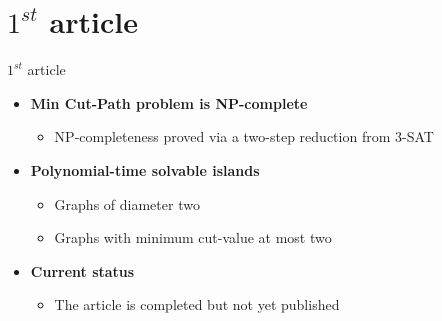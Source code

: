 \documentclass [xcolor=svgnames, t] {beamer}
\begin{document}
\section{$1^{st}$ article}


\begin{frame}{$1^{st}$ article}
\begin{itemize}
    \item \textbf{Min Cut-Path problem is NP-complete}
    \begin{itemize}
        \item NP-completeness proved via a two-step reduction from \textsc{3-SAT}
    \end{itemize}
    
    \item \textbf{Polynomial-time solvable islands}
    \begin{itemize}
        \item Graphs of diameter two
        \item Graphs with minimum cut-value at most two
    \end{itemize}
    
    \vspace{0.3cm}
    \item \textbf{Current status}
    \begin{itemize}
        \item The article is completed but not yet published
    \end{itemize}
\end{itemize}
\end{frame}
\end{document}
